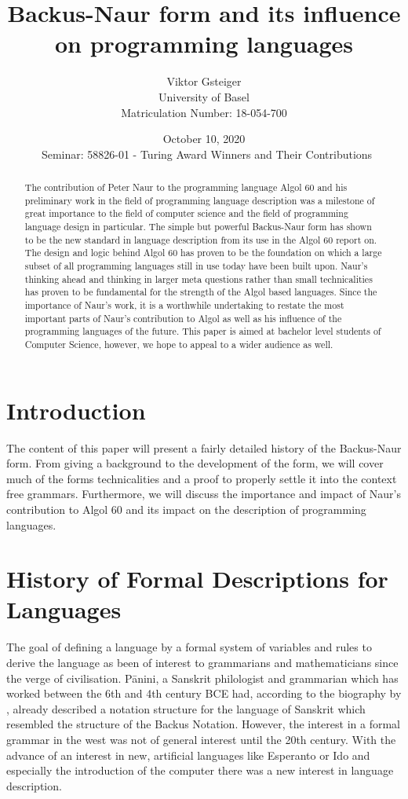 \documentclass{article}
\author{Viktor Gsteiger \\ University of Basel \\ Matriculation Number: 18-054-700}
\title{Backus-Naur form and its influence on programming languages}
\date{October 10, 2020 \\\ Seminar: 58826-01 - Turing Award Winners and Their Contributions}
\begin{document}
\maketitle

\begin{abstract}
	The contribution of Peter Naur to the programming language Algol 60 and his preliminary work in the field of programming language description was a milestone of great importance to the field of computer science and the field of programming language design in particular. The simple but powerful Backus-Naur form has shown to be the new standard in language description from its use in the Algol 60 report on. The design and logic behind Algol 60 has proven to be the foundation on which a large subset of all programming languages still in use today have been built upon. Naur's thinking ahead and thinking in larger meta questions rather than small technicalities has proven to be fundamental for the strength of the Algol based languages. Since the importance of Naur's work, it is a worthwhile undertaking to restate the most important parts of Naur's contribution to Algol as well as his influence of the programming languages of the future. This paper is aimed at bachelor level students of Computer Science, however, we hope to appeal to a wider audience as well.
\end{abstract}

\newpage

\section{Introduction}
The content of this paper will present a fairly detailed history of the Backus-Naur form. From giving a background to the development of the form, we will cover much of the forms technicalities and a proof to properly settle it into the context free grammars. Furthermore, we will discuss the importance and impact of Naur's contribution to Algol 60 and its impact on the description of programming languages.

\section{History of Formal Descriptions for Languages}
The goal of defining a language by a formal system of variables and rules to derive the language as been of interest to grammarians and mathematicians since the verge of civilisation. Pānini, a Sanskrit philologist and grammarian which has worked between the 6th and 4th century BCE had, according to the biography by \cite{bhate2002panini}, already described a notation structure for the language of Sanskrit which resembled the structure of the Backus Notation. However, the interest in a formal grammar in the west was not of general interest until the 20th century. With the advance of an interest in new, artificial languages like Esperanto or Ido and especially the introduction of the computer there was a new interest in language description.
\end{document}

